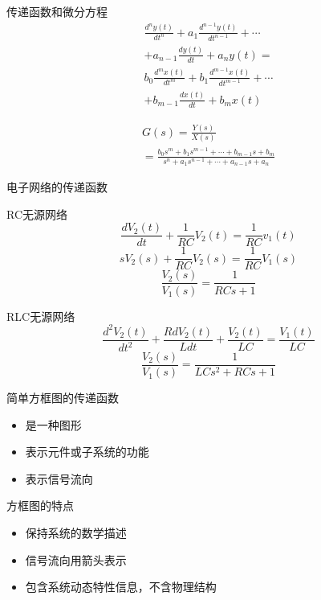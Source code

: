  \begin{frame}[containsverbatim]{传递函数和微分方程}
\begin{eqnarray*}
 \frac{d^n y(t)}{dt^n}+a_1\frac{d^{n-1}y(t)}{dt^{n-1}}+\cdots \\ 
 +a_{n-1}\frac{dy(t)}{dt}+a_ny(t)=
 \\  b_0\frac{d^mx(t)}{dt^m}+b_1\frac{d^{m-1}x(t)}{dt^{m-1}}+\cdots \\
 +b_{m-1}\frac{dx(t)}{dt}+b_mx(t)
 \end{eqnarray*}
 \end{frame}
 \begin{frame}
 \begin{eqnarray*}
 G(s)=\frac{Y(s)}{X(s)}\\ 
 =\frac{b_0s^m+b_1s^{m-1}+\cdots +b_{m-1}s+b_m}{s^n+a_1s^{n-1}+\cdots +a_{n-1}s+a_n}
 \end{eqnarray*}
 \end{frame}
 \begin{frame}{电子网络的传递函数}
 \begin{block}{RC无源网络}
 \[\frac{dV_2(t)}{dt}+\frac{1}{RC}V_2(t)=\frac{1}{RC}v_1(t)\]
 \[sV_2(s)+\frac{1}{RC}V_2(s)=\frac{1}{RC}V_1(s)\]
 \[\frac{V_2(s)}{V_1(s)}=\frac{1}{RCs+1}\]
 \end{block}
 \end{frame}
 \begin{frame}
 \begin{block}{RLC无源网络}
 \[\frac{d^2V_2(t)}{dt^2}+\frac{RdV_2(t)}{Ldt}+\frac{V_2(t)}{LC}=\frac{V_1(t)}{LC}
 \]
 \[\frac{V_2(s)}{V_1(s)}=\frac{1}{LCs^2+RCs+1}
 \]
 \end{block}
 \end{frame}
 \begin{frame}{简单方框图的传递函数}
 \begin{definition}
 \begin{itemize}
 \item 是一种图形
 \item 表示元件或子系统的功能
 \item 表示信号流向
 \end{itemize} 
 \end{definition}
 \begin{block}{方框图的特点}
 \begin{itemize}
 \item 保持系统的数学描述
 \item 信号流向用箭头表示
 \item 包含系统动态特性信息，不含物理结构
 \end{itemize} 
 \end{block}
 \end{frame}
